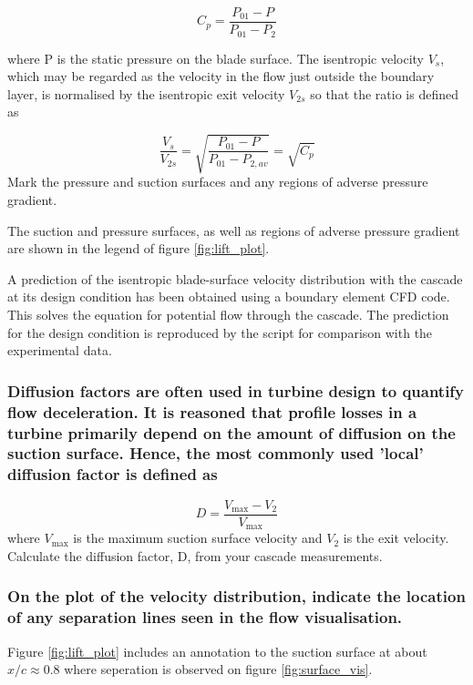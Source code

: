 \documentclass{article}
\begin{document}
\begin{equation}
    C_p = \frac{P_{01} - P}{P_{01} - P_2}
\end{equation}

where P is the static pressure on the blade surface. The isentropic velocity
$V_s$, which may be
regarded as the velocity in the flow just outside the boundary layer, is normalised by the
isentropic exit velocity
$V_{2s}$ so that the ratio is defined as

\begin{equation}
    \frac{V_s}{V_{2s}} = \sqrt{\frac{P_{01} - P}{P_{01} - P_{2,av}}} = \sqrt{C_p}
\end{equation}
Mark the pressure and suction surfaces and any regions of adverse pressure gradient.

The suction and pressure surfaces, as well as regions of adverse pressure gradient are shown in the legend of figure \ref{fig:lift_plot}.

A prediction of the isentropic blade-surface velocity distribution with the cascade at its
design condition has been obtained using a boundary element CFD code. This solves the
equation for potential flow through the cascade. The prediction for the design condition is
reproduced by the script for comparison with the experimental data.

\subsubsection{Diffusion factors are often used in turbine design to quantify flow deceleration. It is
reasoned that profile losses in a turbine primarily depend on the amount of diffusion on the
suction surface. Hence, the most commonly used 'local' diffusion factor is defined as
}

\begin{equation}
    D = \frac{V_\text{max} - V_2}{V_\text{max}}
\end{equation}
where
$V_\text{max}$ is the maximum suction surface velocity and
$V_2$ is the exit velocity. Calculate the
diffusion factor, D, from your cascade measurements.

\subsubsection{On the plot of the velocity distribution, indicate the location of any separation lines seen
in the flow visualisation.}

Figure \ref{fig:lift_plot} includes an annotation to the suction surface at about $x/c \approx 0.8$ where seperation is observed on figure \ref{fig:surface_vis}.
\end{document}
